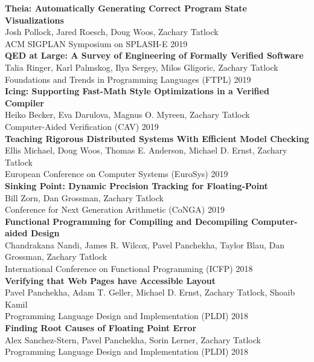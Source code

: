 \documentclass[10pt]{article}
\begin{document}
\textbf{%
Theia: Automatically Generating Correct Program State Visualizations
} \\
Josh Pollock, Jared Roesch, Doug Woos, Zachary Tatlock \\
ACM SIGPLAN Symposium on SPLASH-E 2019 \\

\textbf{%
QED at Large: A Survey of Engineering of Formally Verified Software
} \\
Talia Ringer, Karl Palmskog, Ilya Sergey, Milos Gligoric, Zachary Tatlock \\
Foundations and Trends in Programming Languages (FTPL) 2019 \\

\textbf{%
Icing: Supporting Fast-Math Style Optimizations in a Verified Compiler
} \\
Heiko Becker, Eva Darulova, Magnus O. Myreen, Zachary Tatlock \\
Computer-Aided Verification (CAV) 2019 \\

\textbf{%
Teaching Rigorous Distributed Systems With Efficient Model Checking
} \\
Ellis Michael, Doug Woos, Thomas E. Anderson, Michael D. Ernst, Zachary Tatlock \\
European Conference on Computer Systems (EuroSys) 2019 \\

\textbf{%
Sinking Point: Dynamic Precision Tracking for Floating-Point
} \\
Bill Zorn, Dan Grossman, Zachary Tatlock \\
Conference for Next Generation Arithmetic (CoNGA) 2019 \\

\textbf{%
Functional Programming for Compiling and Decompiling Computer-aided Design
} \\
Chandrakana Nandi, James R. Wilcox, Pavel Panchekha, Taylor Blau, Dan Grossman, Zachary Tatlock \\
International Conference on Functional Programming (ICFP) 2018 \\

\textbf{%
Verifying that Web Pages have Accessible Layout
} \\
Pavel Panchekha, Adam T. Geller, Michael D. Ernst, Zachary Tatlock, Shoaib Kamil \\
Programming Language Design and Implementation (PLDI) 2018 \\

\textbf{%
Finding Root Causes of Floating Point Error
} \\
Alex Sanchez-Stern, Pavel Panchekha, Sorin Lerner, Zachary Tatlock \\
Programming Language Design and Implementation (PLDI) 2018 \\
\end{document}
